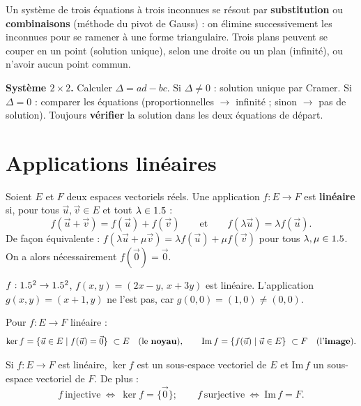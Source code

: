 \begin{remarque}
Un système de trois équations à trois inconnues se résout par \textbf{substitution} ou
\textbf{combinaisons} (méthode du pivot de Gauss) : on élimine successivement les inconnues pour
se ramener à une forme triangulaire. Trois plans peuvent se couper en un point (solution unique),
selon une droite ou un plan (infinité), ou n'avoir aucun point commun.
\end{remarque}

\begin{aretenir}
\textbf{Système $2\times2$.} Calculer $\Delta=ad-bc$. Si $\Delta\neq0$ : solution unique par
Cramer. Si $\Delta=0$ : comparer les équations (proportionnelles $\to$ infinité ; sinon $\to$ pas
de solution). Toujours \textbf{vérifier} la solution dans les deux équations de départ.
\end{aretenir}

\section{Applications linéaires}

\begin{definition}
Soient $E$ et $F$ deux espaces vectoriels réels. Une application $f:E\to F$ est \textbf{linéaire}
si, pour tous $\vec u,\vec v\in E$ et tout $\lambda\in1.5$ :
\[
f(\vec u+\vec v)=f(\vec u)+f(\vec v)\qquad\text{et}\qquad f(\lambda\vec u)=\lambda f(\vec u).
\]
De façon équivalente : $f(\lambda\vec u+\mu\vec v)=\lambda f(\vec u)+\mu f(\vec v)$ pour tous
$\lambda,\mu\in1.5$. On a alors nécessairement $f(\vec 0)=\vec 0$.
\end{definition}

\begin{exemple}
$f:1.5^2\to1.5^2$, $f(x,y)=(2x-y,\,x+3y)$ est linéaire. L'application $g(x,y)=(x+1,y)$ ne l'est
pas, car $g(0,0)=(1,0)\neq(0,0)$.
\end{exemple}

\begin{definition}
Pour $f:E\to F$ linéaire :
\[
\ker f=\{\vec u\in E\mid f(\vec u)=\vec 0\}\ \subset E\quad\text{(le \textbf{noyau})},\qquad
\mathrm{Im}\,f=\{f(\vec u)\mid \vec u\in E\}\ \subset F\quad\text{(l'\textbf{image})}.
\]
\end{definition}

\begin{theoreme}
Si $f:E\to F$ est linéaire, $\ker f$ est un sous-espace vectoriel de $E$ et $\mathrm{Im}\,f$ un
sous-espace vectoriel de $F$. De plus :
\[
f\ \text{injective}\ \Longleftrightarrow\ \ker f=\{\vec 0\};\qquad
f\ \text{surjective}\ \Longleftrightarrow\ \mathrm{Im}\,f=F.
\]
\end{theoreme}

